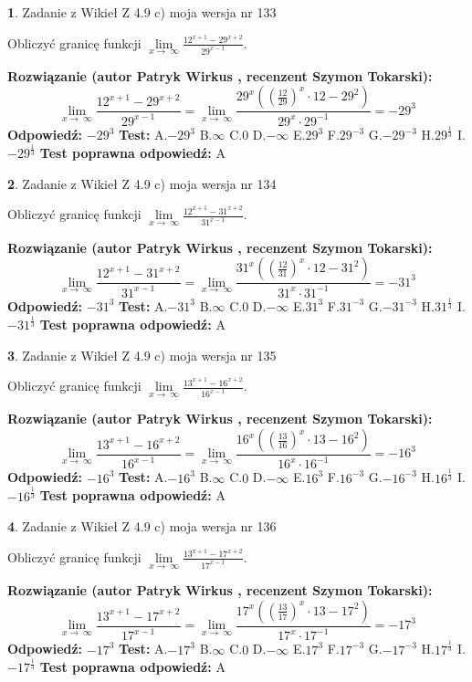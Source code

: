 \documentclass[12pt, a4paper]{article}
\theoremstyle{definition} %
\newtheorem{zad}{}
\newcommand{\zadStart}[1]{\begin{zad}#1\newline}
\newcommand{\zadStop}{\end{zad}}
\newcommand{\rozwStart}[2]{\noindent \textbf{Rozwiązanie (autor #1 , recenzent #2): }\newline}
\newcommand{\rozwStop}{\newline}
\newcommand{\odpStart}{\noindent \textbf{Odpowiedź:}\newline}
\newcommand{\odpStop}{\newline}
\newcommand{\testStart}{\noindent \textbf{Test:}\newline}
\newcommand{\testStop}{\newline}
\newcommand{\kluczStart}{\noindent \textbf{Test poprawna odpowiedź:}\newline}
\newcommand{\kluczStop}{\newline}
\begin{document}
\zadStart{Zadanie z Wikieł Z 4.9 c) moja wersja nr 133}


Obliczyć granicę funkcji  $\lim\limits_{x\to\ \infty}\frac{12^{x+1}-29^{x+2}}{29^{x-1}}$.
\zadStop
\rozwStart{Patryk Wirkus}{Szymon Tokarski}
$$\lim\limits_{x\to\ \infty}\frac{12^{x+1}-29^{x+2}}{29^{x-1}}=\lim\limits_{x\to\ \infty}\frac{29^{x}((\frac{12}{29})^{x}\cdot 12 -29^{2})}{29^{x}\cdot 29^{-1}} = -29^{3}$$
\rozwStop
\odpStart
$-29^{3}$
\odpStop
\testStart
A.$-29^{3}$ B.$\infty$ C.$0$ D.$-\infty$ E.$29^{3}$
F.$29^{-3}$ G.$-29^{-3}$
H.$29^{\frac{1}{3}}$
I.$-29^{\frac{1}{3}}$
\testStop
\kluczStart
A
\kluczStop



\zadStart{Zadanie z Wikieł Z 4.9 c) moja wersja nr 134}


Obliczyć granicę funkcji  $\lim\limits_{x\to\ \infty}\frac{12^{x+1}-31^{x+2}}{31^{x-1}}$.
\zadStop
\rozwStart{Patryk Wirkus}{Szymon Tokarski}
$$\lim\limits_{x\to\ \infty}\frac{12^{x+1}-31^{x+2}}{31^{x-1}}=\lim\limits_{x\to\ \infty}\frac{31^{x}((\frac{12}{31})^{x}\cdot 12 -31^{2})}{31^{x}\cdot 31^{-1}} = -31^{3}$$
\rozwStop
\odpStart
$-31^{3}$
\odpStop
\testStart
A.$-31^{3}$ B.$\infty$ C.$0$ D.$-\infty$ E.$31^{3}$
F.$31^{-3}$ G.$-31^{-3}$
H.$31^{\frac{1}{3}}$
I.$-31^{\frac{1}{3}}$
\testStop
\kluczStart
A
\kluczStop



\zadStart{Zadanie z Wikieł Z 4.9 c) moja wersja nr 135}


Obliczyć granicę funkcji  $\lim\limits_{x\to\ \infty}\frac{13^{x+1}-16^{x+2}}{16^{x-1}}$.
\zadStop
\rozwStart{Patryk Wirkus}{Szymon Tokarski}
$$\lim\limits_{x\to\ \infty}\frac{13^{x+1}-16^{x+2}}{16^{x-1}}=\lim\limits_{x\to\ \infty}\frac{16^{x}((\frac{13}{16})^{x}\cdot 13 -16^{2})}{16^{x}\cdot 16^{-1}} = -16^{3}$$
\rozwStop
\odpStart
$-16^{3}$
\odpStop
\testStart
A.$-16^{3}$ B.$\infty$ C.$0$ D.$-\infty$ E.$16^{3}$
F.$16^{-3}$ G.$-16^{-3}$
H.$16^{\frac{1}{3}}$
I.$-16^{\frac{1}{3}}$
\testStop
\kluczStart
A
\kluczStop



\zadStart{Zadanie z Wikieł Z 4.9 c) moja wersja nr 136}


Obliczyć granicę funkcji  $\lim\limits_{x\to\ \infty}\frac{13^{x+1}-17^{x+2}}{17^{x-1}}$.
\zadStop
\rozwStart{Patryk Wirkus}{Szymon Tokarski}
$$\lim\limits_{x\to\ \infty}\frac{13^{x+1}-17^{x+2}}{17^{x-1}}=\lim\limits_{x\to\ \infty}\frac{17^{x}((\frac{13}{17})^{x}\cdot 13 -17^{2})}{17^{x}\cdot 17^{-1}} = -17^{3}$$
\rozwStop
\odpStart
$-17^{3}$
\odpStop
\testStart
A.$-17^{3}$ B.$\infty$ C.$0$ D.$-\infty$ E.$17^{3}$
F.$17^{-3}$ G.$-17^{-3}$
H.$17^{\frac{1}{3}}$
I.$-17^{\frac{1}{3}}$
\testStop
\kluczStart
A
\kluczStop
\end{document}
